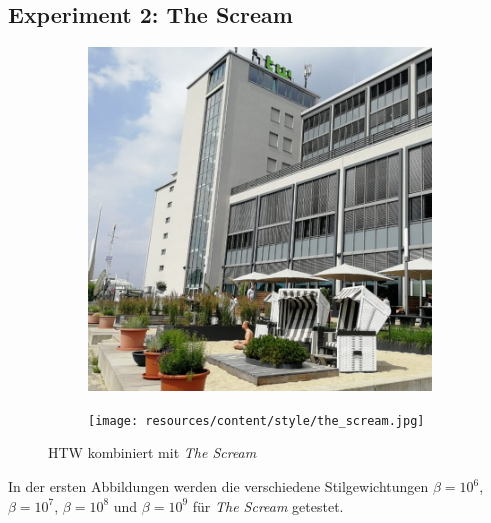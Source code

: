 \pagebreak

\subsection{Experiment 2: The Scream}

\begin{figure}[H]
    \centering
    \begin{subfigure}[h]{0.35\textwidth}
        \centering
        \includegraphics[width=\textwidth]{resources/content/content/htw-768x768.jpg}
    \end{subfigure}
    \begin{subfigure}[h]{0.35\textwidth}
        \centering
        \texttt{[image: resources/content/style/the\_scream.jpg]}
    \end{subfigure}
    \caption{HTW kombiniert mit \textit{The Scream} \cite{the_scream_img}}
\end{figure}

In der ersten Abbildungen werden die verschiedene Stilgewichtungen $ \beta = 10^{6} $, $ \beta = 10^{7} $, $ \beta = 10^{8} $ und $ \beta = 10^{9} $ für \textit{The Scream} getestet.

